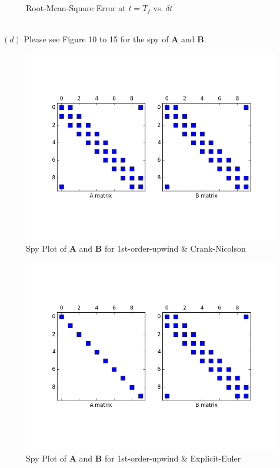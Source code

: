 \documentclass[12pt]{article}
\newenvironment{problem}[2][Problem]{\begin{trivlist}
\item[\hskip \labelsep {\bfseries #1}\hskip \labelsep {\bfseries #2.}]}{\end{trivlist}}
\begin{document}
\begin{problem}{2}
\begin{figure}[H]
 \caption{Root-Mean-Square Error at $t=T_f$ vs. $\delta t$}
\label{label}
\end{figure}
\text{}\\
$(d)$ Please see Figure 10 to 15 for the spy of $\mathbf{A}$ and $\mathbf{B}$.\\
\begin{figure}[H]
\centering
  \includegraphics[scale=0.5]{p2d_1st_cn.png}
 \caption{Spy Plot of $\mathbf{A}$ and $\mathbf{B}$ for 1st-order-upwind \& Crank-Nicolson}
\label{label}
\end{figure}
\begin{figure}[H]
\centering
  \includegraphics[scale=0.5]{p2d_u1st_ee.png}
 \caption{Spy Plot of $\mathbf{A}$ and $\mathbf{B}$ for 1st-order-upwind \& Explicit-Euler}

\end{figure}
\end{problem}
\end{document}
